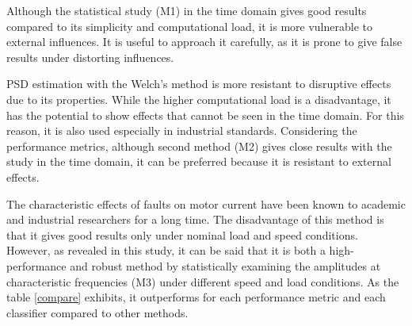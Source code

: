 Although the statistical study (M1) in the time domain gives good results compared to its simplicity and computational load, it is more vulnerable to external influences. It is useful to approach it carefully, as it is prone to give false results under distorting influences.

PSD estimation with the Welch's method is more resistant to disruptive effects due to its properties. While the higher computational load is a disadvantage, it has the potential to show effects that cannot be seen in the time domain. For this reason, it is also used especially in industrial standards. Considering the performance metrics, although second method (M2) gives close results with the study in the time domain, it can be preferred because it is resistant to external effects.

The characteristic effects of faults on motor current have been known to academic and industrial researchers for a long time. The disadvantage of this method is that it gives good results only under nominal load and speed conditions. However, as revealed in this study, it can be said that it is both a high-performance and robust method by statistically examining the amplitudes at characteristic frequencies (M3) under different speed and load conditions. As the table \ref{compare} exhibits, it outperforms for each performance metric and each classifier compared to other methods.

